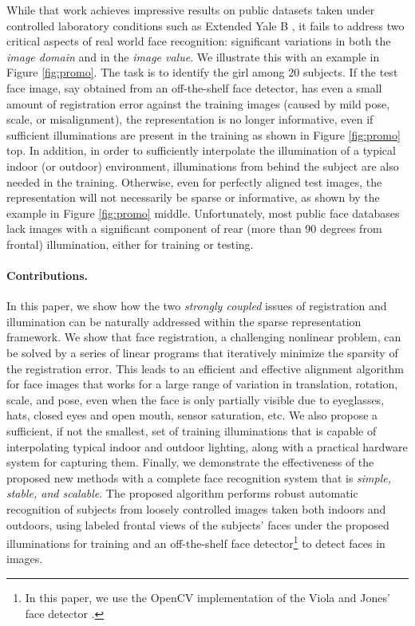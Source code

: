 \documentclass[10pt,twocolumn,letterpaper]{article}
\begin{document}
While that work achieves impressive results on public datasets taken under controlled laboratory conditions such as Extended Yale B \cite{Georghiades2001-PAMI}, it fails to address two critical aspects of real world face recognition: significant variations in both the {\em image domain} and in the {\em image value}. We illustrate this with an example in  Figure \ref{fig:promo}. The task is to identify the girl among 20 subjects. If the test face image, say obtained from an off-the-shelf face detector, has even a small amount of registration error against the training images (caused by mild pose, scale, or misalignment), the representation is no longer informative, even if sufficient illuminations are present in the training as shown in Figure \ref{fig:promo} top. In addition, in order to sufficiently interpolate the illumination of a typical indoor (or outdoor) environment, illuminations from behind the subject are also needed in the training. Otherwise, even for perfectly aligned test images, the representation will not necessarily be sparse or informative, as shown by the example in Figure \ref{fig:promo} middle. Unfortunately, most public face databases lack images with a significant component of rear (more than 90 degrees from frontal) illumination, either for training or testing.\vspace{-4mm}

\paragraph{Contributions.} In this paper, we show how the two {\em strongly coupled} issues of registration and illumination can be naturally addressed within the sparse representation framework. We show that face registration, a challenging nonlinear problem, can be solved by a series of linear programs that iteratively minimize the sparsity of the registration error. This leads to an efficient and effective alignment algorithm for face images that works for a large range of variation in translation, rotation, scale, and pose, even when the face is only partially visible due to eyeglasses, hats, closed eyes and open mouth, sensor saturation, etc.  We also propose a sufficient, if not the smallest, set of training illuminations that is capable of interpolating typical indoor and outdoor lighting, along with a practical hardware system for capturing them.  Finally, we demonstrate the effectiveness of the proposed new methods with a complete face recognition system that is {\em simple, stable, and scalable}. 
The proposed algorithm performs robust automatic recognition of subjects from loosely controlled images taken both indoors and outdoors, using labeled frontal views of the subjects' faces under the proposed illuminations for training and an off-the-shelf face detector\footnote{In this paper, we use the OpenCV implementation of the Viola and Jones' face detector \cite{Viola2004-IJCV}.} to detect faces in images. \vspace{-3mm}
\end{document}
